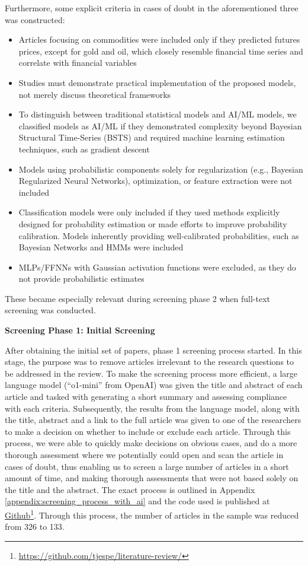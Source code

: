 Furthermore, some explicit criteria in cases of doubt in the aforementioned three was constructed:
\begin{itemize}
    \item Articles focusing on commodities were included only if they predicted futures prices, except for gold and oil, which closely resemble financial time series and correlate with financial variables \parencite{Gokmenoglu2015}
    \item Studies must demonstrate practical implementation of the proposed models, not merely discuss theoretical frameworks
    \item To distinguish between traditional statistical models and AI/ML models, we classified models as AI/ML if they demonstrated complexity beyond Bayesian Structural Time-Series (BSTS) and required machine learning estimation techniques, such as gradient descent
    \item Models using probabilistic components solely for regularization (e.g., Bayesian Regularized Neural Networks), optimization, or feature extraction were not included
    \item Classification models were only included if they used methods explicitly designed for probability estimation or made efforts to improve probability calibration. Models inherently providing well-calibrated probabilities, such as Bayesian Networks and HMMs were included
    \item MLPs/FFNNs with Gaussian activation functions were excluded, as they do not provide probabilistic estimates
\end{itemize}
These became especially relevant during screening phase 2 when full-text screening was conducted. 

\textbf{Screening Phase 1: Initial Screening}\nopagebreak

After obtaining the initial set of papers, phase 1 screening process started. In this stage, the purpose was to remove articles irrelevant to the research questions to be addressed in the review.
To make the screening process more efficient, a large language model (``o1-mini'' from OpenAI) was given the title and abstract of each article and tasked with generating a short summary and assessing compliance with each criteria. Subsequently, the results from the language model, along with the title, abstract and a link to the full article was given to one of the researchers to make a decision on whether to include or exclude each article. Through this process, we were able to quickly make decisions on obvious cases, and do a more thorough assessment where we potentially could open and scan the article in cases of doubt, thus enabling us to screen a large number of articles in a short amount of time, and making thorough assessments that were not based solely on the title and the abstract. The exact process is outlined in Appendix \ref{appendix:screening_process_with_ai} and the code used is published at \hyperlink{https://github.com/tjespe/literature-review/}{Github}\footnote{\label{footnote:github_link}\hyperlink{https://github.com/tjespe/literature-review/}{https://github.com/tjespe/literature-review/}}. Through this process, the number of articles in the sample was reduced from 326 to 133.

